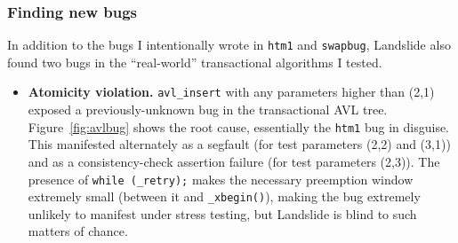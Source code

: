 \subsubsection{Finding new bugs}

In addition to the bugs I intentionally wrote in {\tt htm1} and {\tt swapbug},
Landslide also found two bugs in the ``real-world'' transactional algorithms I tested.
\begin{itemize}
	\item
	{\bf Atomicity violation.}
	{\tt avl\_insert} with any parameters higher than (2,1)
	exposed a previously-unknown bug in the transactional AVL tree.
	Figure~\ref{fig:avlbug} shows the root cause, essentially the {\tt htm1} bug in disguise.
	This manifested
	alternately
	as a segfault (for test parameters (2,2) and (3,1))
	and
	as a consistency-check assertion failure (for test parameters (2,3)).
	The presence of {\tt while (\_retry);} makes the necessary preemption window extremely small
	(between it and {\tt \_xbegin()}),
	making the bug extremely unlikely to manifest under stress testing,
	but Landslide is blind to such matters of chance.


\end{itemize}
